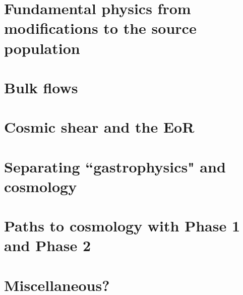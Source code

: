 \documentclass{PoS}
\begin{document}
\section{Fundamental physics from modifications to the source population}

\section{Bulk flows}

\section{Cosmic shear and the EoR}

\section{Separating ``gastrophysics" and cosmology}

\section{Paths to cosmology with Phase 1 and Phase 2}

\section{Miscellaneous?}



{}

\end{document}
